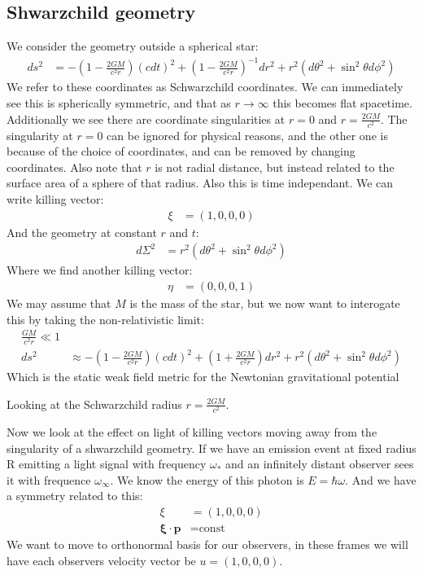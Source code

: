 \subsection{Shwarzchild geometry}
We consider the geometry outside a spherical star:
\begin{align*}
	ds^2 &= -\left(1 -\frac{2GM}{c^2 r}\right)(cdt)^2 + \left(1- \frac{2GM}{c^2 r}\right)^{-1}dr^2 + r^2 (d\theta^2 + \sin^2\theta d\phi^2)
\end{align*}
We refer to these coordinates as Schwarzchild coordinates. We can immediately see this is spherically symmetric, and that as $r\to\infty$ this becomes flat spacetime.
Additionally we see there are coordinate singularities at $r=0$ and $r=\frac{2GM}{c^2}$. The singularity at $r=0$ can be ignored for physical reasons, and the other one is because of the choice of coordinates, and can be removed by changing coordinates.
Also note that $r$ is not radial distance, but instead related to the surface area of a sphere of that radius. Also this is time independant. We can write killing vector:
\begin{align*}
	\xi &= (1,0,0,0)
\end{align*}
And the geometry at constant $r$ and $t$:
\begin{align*}
	d\Sigma^2 &= r^2(d\theta^2 + \sin^2\theta d\phi^2)
\end{align*}
Where we find another killing vector:
\begin{align*}
	\eta &= (0,0,0,1)
\end{align*}
We may assume that $M$ is the mass of the star, but we now want to interogate this by taking the non-relativistic limit:
\begin{align*}
	\frac{GM}{c^2 r} \ll 1 \\
	ds^2 &\approx -\left(1 - \frac{2GM}{c^2r}\right)(cdt)^2 + \left(1+ \frac{2GM}{c^2 r}\right)dr^2 + r^2 (d\theta^2 + \sin^2\theta d\phi^2)
\end{align*}
Which is the static weak field metric for the Newtonian gravitational potential

Looking at the Schwarzchild radius $r = \frac{2GM}{c^2}$.

Now we look at the effect on light of killing vectors moving away from the singularity of a shwarzchild geometry.
If we have an emission event at fixed radius R emitting a light signal with frequency $\omega_*$ and an infinitely distant observer sees it with frequence $\omega_\infty$.
We know the energy of this photon is $E=\hbar\omega$. And we have a symmetry related to this:
\begin{align*}
	\xi &= (1,0,0,0) \\
	\bm{\xi}\cdot\bm{p} &= \text{const}
\end{align*}
We want to move to orthonormal basis for our observers, in these frames we will have each observers velocity vector be $u = (1,0,0,0)$.


